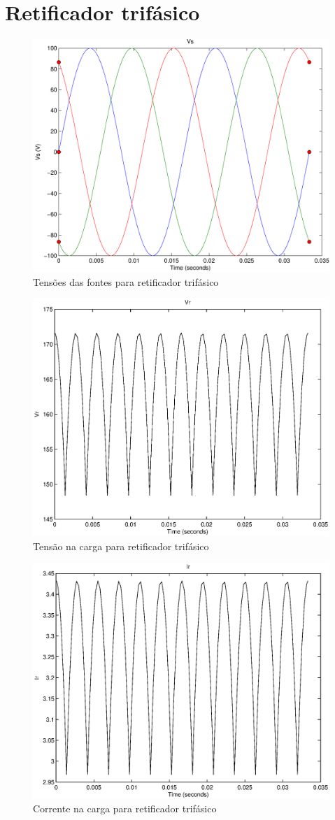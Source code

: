 \documentclass{report}
\begin{document}
\section{Retificador trifásico}
\begin{figure}[H]
	\centering
	\includegraphics[width=0.7\linewidth]{matlab/tri_vs}
	\caption{Tensões das fontes para retificador trifásico}
	\label{fig:tvs}
\end{figure}
\begin{figure}[H]
	\centering
	\includegraphics[width=0.7\linewidth]{matlab/tri_vr}
	\caption{Tensão na carga para retificador trifásico}
	\label{fig:tvr}
\end{figure}
\begin{figure}[H]
	\centering
	\includegraphics[width=0.7\linewidth]{matlab/tri_ir}
	\caption{Corrente na carga para retificador trifásico}
	\label{fig:tir}
\end{figure}
\end{document}
